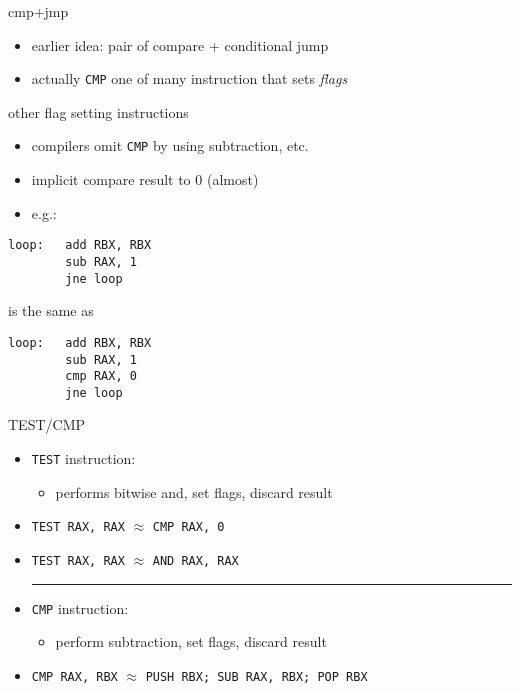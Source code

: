 \begin{frame}{cmp+jmp}
    \begin{itemize}
    \item earlier idea: pair of compare + conditional jump
    \item actually \texttt{CMP} one of many instruction that sets \textit{flags}
    \end{itemize}
\end{frame}

\begin{frame}[fragile,label=otherFlags]{other flag setting instructions}
\begin{itemize}
\item compilers omit \texttt{CMP} by using subtraction, etc.
\item implicit compare result to 0 (almost)
\item e.g.:
\end{itemize}
\begin{lstlisting}
loop:   add RBX, RBX
        sub RAX, 1
        jne loop
\end{lstlisting}
is the same as
\begin{lstlisting}
loop:   add RBX, RBX
        sub RAX, 1
        cmp RAX, 0
        jne loop
\end{lstlisting}
\end{frame}

\begin{frame}[fragile,label=testCmp]{TEST/CMP}
\begin{itemize}
\item \texttt{TEST} instruction:
    \begin{itemize}
    \item performs bitwise and, set flags, discard result
    \end{itemize}
\item \texttt{TEST RAX, RAX} $\approx$ \texttt{CMP RAX, 0}
\item \texttt{TEST RAX, RAX} $\approx$ \texttt{AND RAX, RAX}
\hrule
\item \texttt{CMP} instruction:
    \begin{itemize}
    \item perform subtraction, set flags, discard result
    \end{itemize}
\item \texttt{CMP RAX, RBX} $\approx$ \texttt{PUSH RBX; SUB RAX, RBX; POP RBX}
\end{itemize}
\end{frame}

